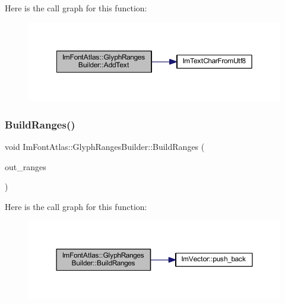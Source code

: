 Here is the call graph for this function\+:
\nopagebreak
\begin{figure}[H]
\begin{center}
\leavevmode
\includegraphics[width=350pt]{struct_im_font_atlas_1_1_glyph_ranges_builder_a6c0f9756dc8ea184920d5ff28bfdb669_cgraph}
\end{center}
\end{figure}
\mbox{\label{struct_im_font_atlas_1_1_glyph_ranges_builder_aa55b5710971adef2e4c690a3e46de6d5}} 
\subsubsection{\texorpdfstring{Build\+Ranges()}{BuildRanges()}}
{\footnotesize\ttfamily void Im\+Font\+Atlas\+::\+Glyph\+Ranges\+Builder\+::\+Build\+Ranges (\begin{DoxyParamCaption}\item[{\mbox{\hyperlink{class_im_vector}{Im\+Vector}}$<$ \mbox{\hyperlink{imgui_8h_af2c7badaf05a0008e15ef76d40875e97}{Im\+Wchar}} $>$ $\ast$}]{out\+\_\+ranges }\end{DoxyParamCaption})}

Here is the call graph for this function\+:
\nopagebreak
\begin{figure}[H]
\begin{center}
\leavevmode
\includegraphics[width=350pt]{struct_im_font_atlas_1_1_glyph_ranges_builder_aa55b5710971adef2e4c690a3e46de6d5_cgraph}
\end{center}
\end{figure}
\mbox{\label{struct_im_font_atlas_1_1_glyph_ranges_builder_a3402695bdeebd7528da9f143b385fb27}} 
